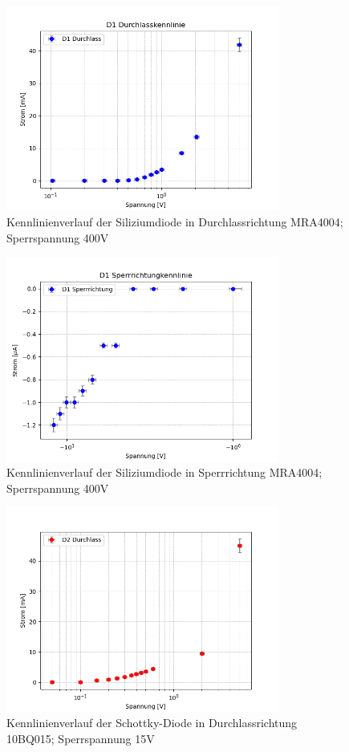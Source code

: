 \documentclass{article}
\theoremstyle{definition}
\begin{document}
\begin{figure}[H]
    \centering
    \includegraphics[width=0.8\textwidth]{figs/dioden_d1.png}
    \caption{Kennlinienverlauf der Siliziumdiode in Durchlassrichtung MRA4004; Sperrspannung 400V\cite{anleitung} }
    \label{dioden_d1}
\end{figure}

\begin{figure}[H]
    \centering
    \includegraphics[width=0.8\textwidth]{figs/dioden_d1_sperr.png}
    \caption{Kennlinienverlauf der Siliziumdiode in Sperrrichtung MRA4004; Sperrspannung 400V\cite{anleitung}}
    \label{dioden_d1_sperr}
\end{figure}

\begin{figure}[H]
    \centering
    \includegraphics[width=0.8\textwidth]{figs/dioden_d2.png}
    \caption{Kennlinienverlauf der Schottky-Diode in Durchlassrichtung 10BQ015; Sperrspannung 15V\cite{anleitung}}
    \label{dioden_d2}
\end{figure}
\end{document}
